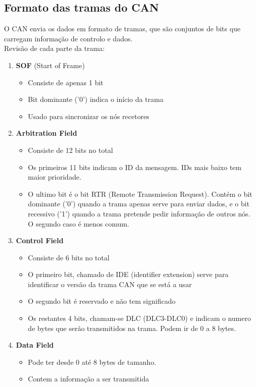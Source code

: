 \documentclass[a4paper, 12pt, onecolumn, oneside]{scrartcl}
\begin{document}
\subsection{Formato das tramas do CAN}
O CAN envia os dados em formato de tramas, que são conjuntos de bits que carregam informação de controlo e dados.
\\Revisão de cada parte da trama:
\begin{enumerate}
    \item \textbf{SOF} (Start of Frame)
    \begin{itemize}
        \item Consiste de apenas 1 bit 
        \item Bit dominante ('0') indica o início da trama
        \item Usado para sincronizar os nós recetores
    \end{itemize}
    \item \textbf{Arbitration Field}
    \begin{itemize}
        \item Consiste de 12 bits no total
        \item Os primeiros 11 bits indicam o ID da mensagem. IDs mais baixo tem maior prioridade.
        \item O ultimo bit é o bit RTR (Remote Transmission Request). Contém o bit dominante ('0') quando a trama apenas serve para enviar dados,
        e o bit recessivo ('1') quando a trama pretende pedir informação de outros nós. O segundo caso é menos comum. 
    \end{itemize}
    \item \textbf{Control Field}
    \begin{itemize}
        \item Consiste de 6 bits no total
        \item O primeiro bit, chamado de IDE (identifier extension) serve para identificar o versão da trama CAN que se está a usar
        \item O segundo bit é reservado e não tem significado
        \item Os restantes 4 bits, chamam-se DLC (DLC3-DLC0) e indicam o numero de bytes que serão transmitidos na trama. Podem ir de 0 a 8 bytes.
    \end{itemize}
    \item \textbf{Data Field}
    \begin{itemize}
        \item Pode ter desde 0 até 8 bytes de tamanho.
        \item Contem a informação a ser transmitida

\end{itemize}
\end{enumerate}
\end{document}
